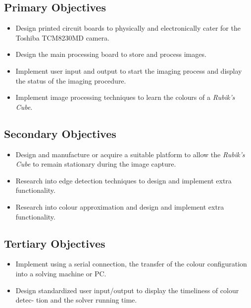 \documentclass[11pt, a4paper, oneside]{Thesis} %
\begin{document}
\subsection{Primary Objectives}
\begin{itemize}
\item Design printed circuit boards to physically and electronically cater for the Toshiba
TCM8230MD camera.
\item Design the main processing board to store and process images.
\item Implement user input and output to start the imaging process and display the
status of the imaging procedure.
\item Implement image processing techniques to learn the colours of a \emph{Rubik's Cube}.
\end{itemize}

\subsection{Secondary Objectives}
\begin{itemize}
\item Design and manufacture or acquire a suitable platform to allow the \emph{Rubik’s Cube}
to remain stationary during the image capture.
\item Research into edge detection techniques to design and implement extra functionality.
\item Research into colour approximation and design and implement extra functionality.
\end{itemize}

\subsection{Tertiary Objectives}
\begin{itemize}
\item Implement using a serial connection, the transfer of the colour configuration into
a solving machine or PC.
\item Design standardized user input/output to display the timeliness of colour detec-
tion and the solver running time.
\end{itemize}
\end{document}
